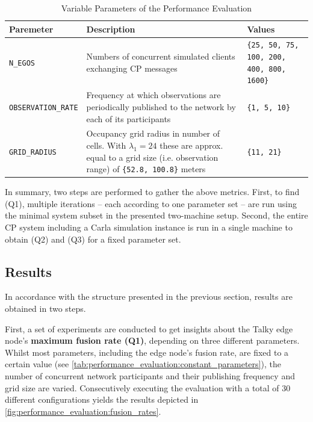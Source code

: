 \begin{table}
	\centering
	\begin{tabular}{|p{3.5cm}|p{8.5cm}|p{3.2cm}|}
		\hline 
		\textbf{Paremeter} & \textbf{Description} & \textbf{Values} \\ 
		\hline 
		\texttt{N\_EGOS} & Numbers of concurrent simulated clients exchanging CP messages & \texttt{\{25, 50, 75, 100, 200, 400, 800, 1600\}} \\ 
		\hline 
		\texttt{OBSERVATION\_RATE} & Frequency at which observations are periodically published to the network by each of its participants & \texttt{\{1, 5, 10\}} \\ 
		\hline 
		\texttt{GRID\_RADIUS} & Occupancy grid radius in number of cells. With $\lambda_1 = 24$ these are approx. equal to a grid size (i.e. observation range) of \texttt{\{52.8, 100.8\}} meters & \texttt{\{11, 21\}} \\ 
		\hline 
	\end{tabular}
	\caption{Variable Parameters of the Performance Evaluation}
	\label{tab:performance_evaluation:variable_parameters}
\end{table}

In summary, two steps are performed to gather the above metrics. First, to find (Q1), multiple iterations – each according to one parameter set – are run using the minimal system subset in the presented two-machine setup. Second, the entire CP system including a Carla simulation instance is run in a single machine to obtain (Q2) and (Q3) for a fixed parameter set. 

\subsection{Results}
\label{subsec:evaluation:performance_evaluation:results}
In accordance with the structure presented in the previous section, results are obtained in two steps.
\par
\bigskip

First, a set of experiments are conducted to get insights about the Talky edge node's \textbf{maximum fusion rate (Q1)}, depending on three different parameters. Whilst most parameters, including the edge node's fusion rate, are fixed to a certain value (see \cref{tab:performance_evaluation:constant_parameters}), the number of concurrent network participants and their publishing frequency and grid size are varied. Consecutively executing the evaluation with a total of 30 different configurations yields the results depicted in \cref{fig:performance_evaluation:fusion_rates}.

